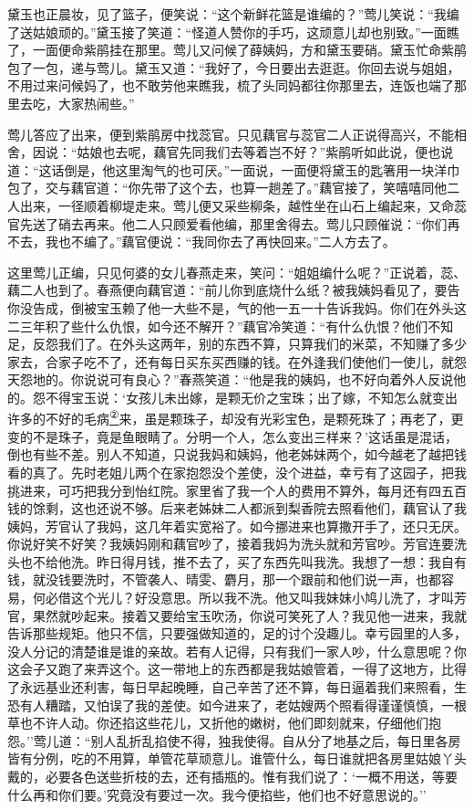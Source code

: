 黛玉也正晨妆，见了篮子，便笑说：``这个新鲜花篮是谁编的？''莺儿笑说：``我编了送姑娘顽的。''黛玉接了笑道：``怪道人赞你的手巧，这顽意儿却也别致。''一面瞧了，一面便命紫鹃挂在那里。莺儿又问候了薛姨妈，方和黛玉要硝。黛玉忙命紫鹃包了一包，递与莺儿。黛玉又道：``我好了，今日要出去逛逛。你回去说与姐姐，不用过来问候妈了，也不敢劳他来瞧我，梳了头同妈都往你那里去，连饭也端了那里去吃，大家热闹些。''

莺儿答应了出来，便到紫鹃房中找蕊官。只见藕官与蕊官二人正说得高兴，不能相舍，因说：``姑娘也去呢，藕官先同我们去等着岂不好？''紫鹃听如此说，便也说道：``这话倒是，他这里淘气的也可厌。''一面说，一面便将黛玉的匙箸用一块洋巾包了，交与藕官道：``你先带了这个去，也算一趟差了。''藕官接了，笑嘻嘻同他二人出来，一径顺着柳堤走来。莺儿便又采些柳条，越性坐在山石上编起来，又命蕊官先送了硝去再来。他二人只顾爱看他编，那里舍得去。莺儿只顾催说：``你们再不去，我也不编了。''藕官便说：``我同你去了再快回来。''二人方去了。

这里莺儿正编，只见何婆的女儿春燕走来，笑问：``姐姐编什么呢？''正说着，蕊、藕二人也到了。春燕便向藕官道：``前儿你到底烧什么纸？被我姨妈看见了，要告你没告成，倒被宝玉赖了他一大些不是，气的他一五一十告诉我妈。你们在外头这二三年积了些什么仇恨，如今还不解开？''藕官冷笑道：``有什么仇恨？他们不知足，反怨我们了。在外头这两年，别的东西不算，只算我们的米菜，不知赚了多少家去，合家子吃不了，还有每日买东买西赚的钱。在外逢我们使他们一使儿，就怨天怨地的。你说说可有良心？''春燕笑道：``他是我的姨妈，也不好向着外人反说他的。怨不得宝玉说：`女孩儿未出嫁，是颗无价之宝珠；出了嫁，不知怎么就变出许多的不好的毛病\href{../Text/part0063_split_000.html\#lnkback_2_a}{\textsuperscript{②}}来，虽是颗珠子，却没有光彩宝色，是颗死珠了；再老了，更变的不是珠子，竟是鱼眼睛了。分明一个人，怎么变出三样来？'这话虽是混话，倒也有些不差。别人不知道，只说我妈和姨妈，他老姊妹两个，如今越老了越把钱看的真了。先时老姐儿两个在家抱怨没个差使，没个进益，幸亏有了这园子，把我挑进来，可巧把我分到怡红院。家里省了我一个人的费用不算外，每月还有四五百钱的馀剩，这也还说不够。后来老姊妹二人都派到梨香院去照看他们，藕官认了我姨妈，芳官认了我妈，这几年着实宽裕了。如今挪进来也算撒开手了，还只无厌。你说好笑不好笑？我姨妈刚和藕官吵了，接着我妈为洗头就和芳官吵。芳官连要洗头也不给他洗。昨日得月钱，推不去了，买了东西先叫我洗。我想了一想：我自有钱，就没钱要洗时，不管袭人、晴雯、麝月，那一个跟前和他们说一声，也都容易，何必借这个光儿？好没意思。所以我不洗。他又叫我妹妹小鸠儿洗了，才叫芳官，果然就吵起来。接着又要给宝玉吹汤，你说可笑死了人？我见他一进来，我就告诉那些规矩。他只不信，只要强做知道的，足的讨个没趣儿。幸亏园里的人多，没人分记的清楚谁是谁的亲故。若有人记得，只有我们一家人吵，什么意思呢？你这会子又跑了来弄这个。这一带地上的东西都是我姑娘管着，一得了这地方，比得了永远基业还利害，每日早起晚睡，自己辛苦了还不算，每日逼着我们来照看，生恐有人糟踏，又怕误了我的差使。如今进来了，老姑嫂两个照看得谨谨慎慎，一根草也不许人动。你还掐这些花儿，又折他的嫩树，他们即刻就来，仔细他们抱怨。''莺儿道：``别人乱折乱掐使不得，独我使得。自从分了地基之后，每日里各房皆有分例，吃的不用算，单管花草顽意儿。谁管什么，每日谁就把各房里姑娘丫头戴的，必要各色送些折枝的去，还有插瓶的。惟有我们说了：`一概不用送，等要什么再和你们要。'究竟没有要过一次。我今便掐些，他们也不好意思说的。''

